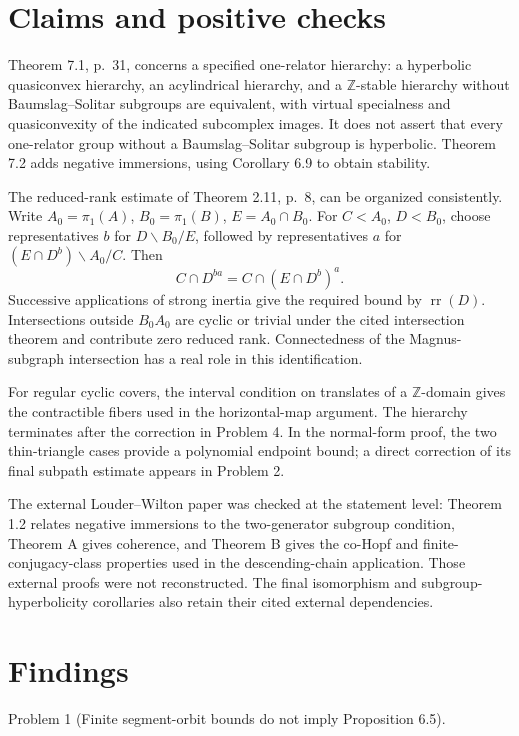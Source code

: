 \documentclass[10pt]{article}
\begin{document}
\section*{Claims and positive checks}
Theorem 7.1, p. 31, concerns a specified one-relator hierarchy: a hyperbolic quasiconvex hierarchy, an acylindrical hierarchy, and a \(\mathbb Z\)-stable hierarchy without Baumslag–Solitar subgroups are equivalent, with virtual specialness and quasiconvexity of the indicated subcomplex images. It does not assert that every one-relator group without a Baumslag–Solitar subgroup is hyperbolic. Theorem 7.2 adds negative immersions, using Corollary 6.9 to obtain stability.\par
The reduced-rank estimate of Theorem 2.11, p. 8, can be organized consistently. Write \(A_0=\pi_1(A)\), \(B_0=\pi_1(B)\), \(E=A_0\cap B_0\). For \(C<A_0\), \(D<B_0\), choose representatives \(b\) for \(D\backslash B_0/E\), followed by representatives \(a\) for \((E\cap D^b)\backslash A_0/C\). Then \[C\cap D^{ba}=C\cap(E\cap D^b)^a.\] Successive applications of strong inertia give the required bound by \(\operatorname{rr}(D)\). Intersections outside \(B_0A_0\) are cyclic or trivial under the cited intersection theorem and contribute zero reduced rank. Connectedness of the Magnus-subgraph intersection has a real role in this identification.\par
For regular cyclic covers, the interval condition on translates of a \(\mathbb Z\)-domain gives the contractible fibers used in the horizontal-map argument. The hierarchy terminates after the correction in Problem 4. In the normal-form proof, the two thin-triangle cases provide a polynomial endpoint bound; a direct correction of its final subpath estimate appears in Problem 2.\par
The external Louder–Wilton paper was checked at the statement level: Theorem 1.2 relates negative immersions to the two-generator subgroup condition, Theorem A gives coherence, and Theorem B gives the co-Hopf and finite-conjugacy-class properties used in the descending-chain application. Those external proofs were not reconstructed. The final isomorphism and subgroup-hyperbolicity corollaries also retain their cited external dependencies.\par
\section*{Findings}
Problem 1 (Finite segment-orbit bounds do not imply Proposition 6.5).\par
\end{document}
